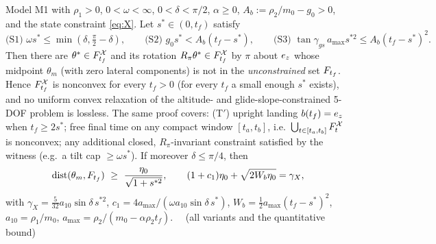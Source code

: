 \begin{theorem}[Theorem B$^*$]\label{thm:Bstar}
Model M1 with $\rho_1>0$, $0<\omega<\infty$, $0<\delta<\pi/2$, $\alpha\ge0$, $A_b:=\rho_2/m_0-g_0>0$, and the state constraint
\eqref{eq:X}. Let $s^*\in(0,t_f)$ satisfy
\[
\text{(S1) }\omega s^*\le\min(\delta,\tfrac\pi2-\delta),\qquad \text{(S2) }g_0s^*<A_b(t_f-s^*),\qquad
\text{(S3) }\tan\gamma_{gs}\,a_{\max}s^{*2}\le A_b(t_f-s^*)^2 .
\]
Then there are $\theta^*\in F^{\mathcal X}_{t_f}$ and its rotation $R_\pi\theta^*\in F^{\mathcal X}_{t_f}$ by $\pi$ about $e_z$ whose midpoint $\theta_m$
(with zero lateral components) is not in the \emph{unconstrained} set $F_{t_f}$. Hence $F^{\mathcal X}_{t_f}$ is nonconvex for every
$t_f>0$ (for every $t_f$ a small enough $s^*$ exists), and no uniform convex relaxation of the altitude- and
glide-slope-constrained 5-DOF problem is lossless. The same proof covers:
(T$'$) upright landing $b(t_f)=e_z$ when $t_f\ge2s^*$;
free final time on any compact window $[t_a,t_b]$, i.e.\ $\bigcup_{t\in[t_a,t_b]}F^{\mathcal X}_t$ is nonconvex;
any additional closed, $R_\pi$-invariant constraint satisfied by the witness (e.g.\ a tilt cap $\ge\omega s^*$).
If moreover $\delta\le\pi/4$, then
\[
\dist(\theta_m,\Ft)\ \ge\ \frac{\eta_0}{\sqrt{1+s^{*2}}},\qquad (1+c_1)\eta_0+\sqrt{2W_b\eta_0}=\gamma_X,
\]
with $\gamma_X=\tfrac5{32}a_{10}\sin\delta\,s^{*2}$, $c_1=4a_{\max}/(\omega a_{10}\sin\delta\,s^{*})$,
$W_b=\tfrac12a_{\max}(t_f-s^*)^2$, $a_{10}=\rho_1/m_0$, $a_{\max}=\rho_2/(m_0-\alpha\rho_2t_f)$.
\
\Sproved\ (all variants and the quantitative bound)
\end{theorem}
